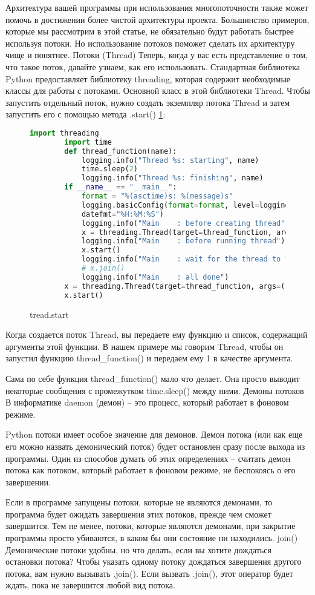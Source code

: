 Архитектура вашей программы при использования многопоточности также может помочь в достижении более чистой архитектуры проекта. Большинство примеров, которые мы рассмотрим в этой статье, не обязательно будут работать быстрее используя потоки. Но использование потоков поможет сделать их архитектуру чище и понятнее. Потоки (Thread)
Теперь, когда у вас есть представление о том, что такое поток, давайте узнаем, как его использовать. Стандартная библиотека Python предоставляет библиотеку threading, которая содержит необходимые классы для работы с потоками. Основной класс в этой библиотеки Thread. Чтобы запустить отдельный поток, нужно создать экземпляр потока Thread и затем запустить его с помощью метода .start() \ref{treading:image}:
\begin{figure}[H]
	\begin{lstlisting}[language=Python]
		import threading
		import time
		def thread_function(name):
			logging.info("Thread %s: starting", name)
			time.sleep(2)
			logging.info("Thread %s: finishing", name)
		if __name__ == "__main__":
			format = "%(asctime)s: %(message)s"
			logging.basicConfig(format=format, level=logging.INFO,
			datefmt="%H:%M:%S")
			logging.info("Main    : before creating thread")
			x = threading.Thread(target=thread_function, args=(1,))
			logging.info("Main    : before running thread")
			x.start()
			logging.info("Main    : wait for the thread to finish")
			# x.join()
			logging.info("Main    : all done")
		x = threading.Thread(target=thread_function, args=(1,))
		x.start()
	\end{lstlisting}  
	\caption{tread.start}
	\label{treading:image}
\end{figure}
Когда создается поток Thread, вы передаете ему функцию и список, содержащий аргументы этой функции. В нашем примере мы говорим Thread, чтобы он запустил функцию thread\_function() и передаем ему 1 в качестве аргумента.

Сама по себе функция thread\_function() мало что делает. Она просто выводит некоторые сообщения с промежутком time.sleep() между ними.
Демоны потоков
В информатике daemon (демон) – это процесс, который работает в фоновом режиме.

Python потоки имеет особое значение для демонов. Демон потока (или как еще его можно назвать демонический поток) будет остановлен сразу после выхода из программы. Один из способов думать об этих определениях – считать демон потока как потоком, который работает в фоновом режиме, не беспокоясь о его завершении.

Если в программе запущены потоки, которые не являются демонами, то программа будет ожидать завершения этих потоков, прежде чем сможет завершится. Тем не менее, потоки, которые являются демонами, при закрытие программы просто убиваются, в каком бы они состояние ни находились.
join()
Демонические потоки удобны, но что делать, если вы хотите дождаться остановки потока? Чтобы указать одному потоку дождаться завершения другого потока, вам нужно вызывать .join().  Если вызвать .join(), этот оператор будет ждать, пока не завершится любой вид потока.
